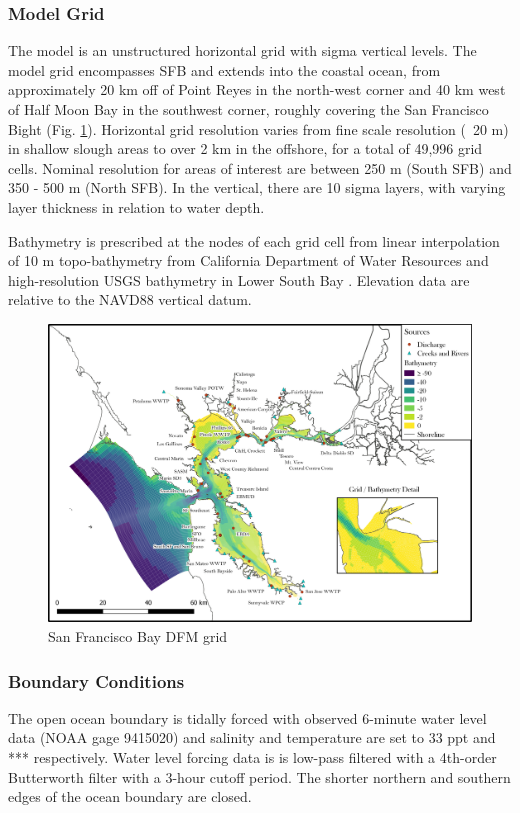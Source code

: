 \documentclass[preprint,review,12pt]{elsarticle}
\begin{document}
\subsubsection{Model Grid}
The model is an unstructured horizontal grid with sigma vertical levels. The model grid encompasses SFB and extends into the coastal ocean, from approximately 20 km off of Point Reyes in the north-west corner and 40 km west of Half Moon Bay in the southwest corner, roughly covering the San Francisco Bight (Fig. \ref{fig:grid}). Horizontal grid resolution varies from fine scale resolution (~20 m) in shallow slough areas to over 2 km in the offshore, for a total of 49,996 grid cells. Nominal resolution for areas of interest are between 250 m (South SFB) and 350 - 500 m (North SFB). In the vertical, there are 10 sigma layers, with varying layer thickness in relation to water depth. 

Bathymetry is prescribed at the nodes of each grid cell from linear interpolation of 10 m topo-bathymetry from California Department of Water Resources \citep{wang2012} and high-resolution USGS bathymetry in Lower South Bay \citep{foxgrover2018}. Elevation data are relative to the NAVD88 vertical datum. 

\begin{figure}[ht!]
\centering
\includegraphics[width=\textwidth]{Figures/grid_inputs_v21.png}
\caption{San Francisco Bay DFM grid}
\label{fig:grid}
\end{figure}
\FloatBarrier

\subsubsection{Boundary Conditions}
The open ocean boundary is tidally forced with observed 6-minute water level data (NOAA gage 9415020) and salinity and temperature are set to 33 ppt and *** respectively. Water level forcing data is is low-pass filtered with a 4th-order Butterworth filter with a 3-hour cutoff period. The shorter northern and southern edges of the ocean boundary are closed.
\end{document}
